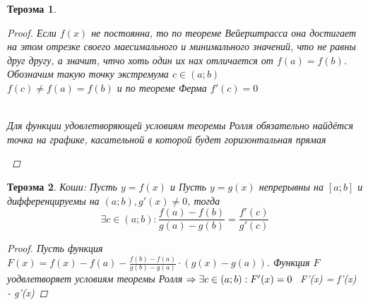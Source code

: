 \documentclass[oneside]{book}
\newtheorem{thm}{Тероэма}[chapter] %
\begin{document}
\begin{enumerate}
\begin{itemize}
\begin{thm}
\begin{proof}
  Если $f(x)$ не постоянна, то по теореме Вейерштрасса она достигает на этом отрезке своего маесимального и минимального значений, что не равны друг другу,
  а значит, чтчо хоть один их нах отличается от  $f(a) = f(b)$. Обозначим такую точку экстремума $c \in (a;b)$ \\
  $f(c) \neq f(a) = f(b)$ и по теореме Ферма $f'(c) = 0$
      \begin{center}
            \\
            Для функции удовлетворяющей условиям теоремы Ролля обязательно найдётся точка на графике, касательной в которой будет горизонтальная прямая
          \end{center}
  \end{proof}
\end{thm}
\begin{thm}
  Коши: Пусть $y = f(x)$ и Пусть $y = g(x)$ непрерывны на $[a; b]$ и дифференцируемы на $(a;b), g'(x) \neq 0$, тогда $$
    \exists c \in (a;b): \frac{f(a) - f(b)}{g(a) - g(b)} = \frac{f'(c)}{g'(c)}
  $$
  \begin{proof}
    Пусть функция $F(x) = f(x) - f(a) - \frac{f(b) - f(a)}{g(b) - g(a)} \cdot (g(x) - g(a))$.
    Функция $F$ уодвлетворяет условиям теоремы Ролля $\Rightarrow \\ \exists c \in (a; b): F'(x) = 0$
    $$
      F'(x) = f'(x) -  \cdot g'(x)


\end{proof}
\end{thm}
\end{itemize}
\end{enumerate}
\end{document}
